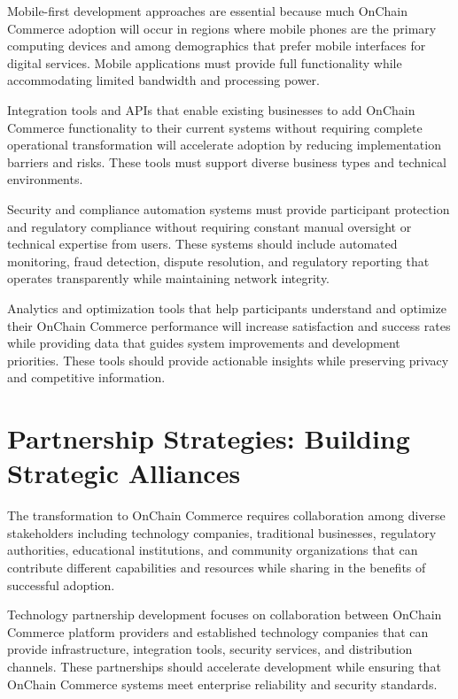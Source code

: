 \documentclass[
  Letterpaper,
]{scrbook}
\begin{document}
Mobile-first development approaches are essential because much OnChain
Commerce adoption will occur in regions where mobile phones are the
primary computing devices and among demographics that prefer mobile
interfaces for digital services. Mobile applications must provide full
functionality while accommodating limited bandwidth and processing
power.

Integration tools and APIs that enable existing businesses to add
OnChain Commerce functionality to their current systems without
requiring complete operational transformation will accelerate adoption
by reducing implementation barriers and risks. These tools must support
diverse business types and technical environments.

Security and compliance automation systems must provide participant
protection and regulatory compliance without requiring constant manual
oversight or technical expertise from users. These systems should
include automated monitoring, fraud detection, dispute resolution, and
regulatory reporting that operates transparently while maintaining
network integrity.

Analytics and optimization tools that help participants understand and
optimize their OnChain Commerce performance will increase satisfaction
and success rates while providing data that guides system improvements
and development priorities. These tools should provide actionable
insights while preserving privacy and competitive information.

\section{Partnership Strategies: Building Strategic
Alliances}\label{partnership-strategies-building-strategic-alliances}

The transformation to OnChain Commerce requires collaboration among
diverse stakeholders including technology companies, traditional
businesses, regulatory authorities, educational institutions, and
community organizations that can contribute different capabilities and
resources while sharing in the benefits of successful adoption.

Technology partnership development focuses on collaboration between
OnChain Commerce platform providers and established technology companies
that can provide infrastructure, integration tools, security services,
and distribution channels. These partnerships should accelerate
development while ensuring that OnChain Commerce systems meet enterprise
reliability and security standards.
\end{document}
